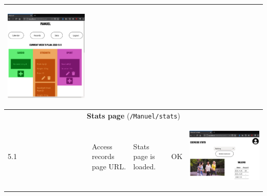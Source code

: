 \documentclass[12pt,twoside,titlepage,a4paper]{article}
\theoremstyle{definicion}
\theoremstyle{lema}
\theoremstyle{teorema}
\theoremstyle{corolario}
\theoremstyle{ejemplo}
\theoremstyle{nota}
\begin{document}
\begin{table}[!h]
\begin{tabular}{|m{0.6cm}|m{2.9cm}|m{3.6cm}|m{1.1cm}|m{5.9cm}|}
		\begin{center}\includegraphics[scale=0.22]{login2-userpage1.png}\end{center} \\
		\hline
		\multicolumn{5}{|c|}{\textbf{Stats page} (\texttt{/Manuel/stats})} \\ 
		\hline
		5.1 & Access records page URL. & Stats page is loaded. & OK &
		\begin{center}\includegraphics[scale=0.22]{userpage3-stats1.png}\end{center} \\

\end{tabular}
\end{table}
\end{document}
